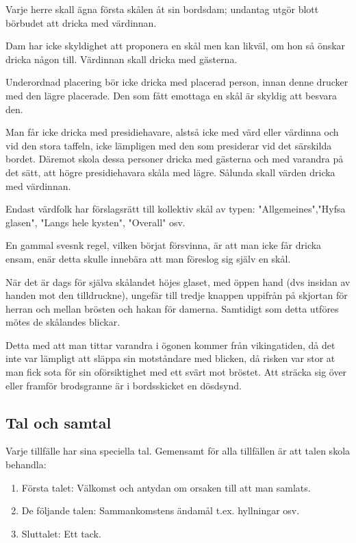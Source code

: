 Varje herre skall ägna första skålen åt sin bordsdam; undantag utgör blott börbudet att dricka med värdinnan.

Dam har icke skyldighet att proponera en skål men kan likväl, om hon så önskar dricka någon till. Värdinnan skall dricka med gästerna.

Underordnad placering bör icke dricka med placerad person, innan denne drucker med den lägre placerade. Den som fått emottaga en skål är skyldig att besvara den.

Man får icke dricka med presidiehavare, alstså icke med värd eller värdinna och vid den stora taffeln, icke lämpligen med den som presiderar vid det särskilda bordet. Däremot skola dessa personer dricka med gästerna och med varandra på det sätt, att högre presidiehavara skåla med lägre. Sålunda skall värden dricka med värdinnan.

Endast värdfolk har förslagsrätt till kollektiv skål av typen: "Allgemeines","Hyfsa glasen", "Langs hele kysten", "Overall" osv.

En gammal svesnk regel, vilken börjat försvinna, är att man icke får dricka ensam, enär detta skulle innebära att man föreslog sig själv en skål.

När det är dags för själva skålandet höjes glaset, med öppen hand (dvs insidan av handen mot den tilldruckne), ungefär till tredje knappen uppifrån på skjortan för herran och mellan brösten och hakan för damerna. Samtidigt som detta utföres mötes de skålandes blickar.

Detta med att man tittar varandra i ögonen kommer från vikingatiden, då det inte var lämpligt att släppa sin motståndare med blicken, då risken var stor at man fick sota för sin oförsiktighet med ett svärt mot bröstet. Att sträcka sig över eller framför brodsgranne är i bordsskicket en dösdsynd.

\subsection{\textbf{Tal och samtal}}

Varje tillfälle har sina speciella tal. Gemensamt för alla tillfällen är att talen skola behandla:
\begin{enumerate}
    \item Första talet: Välkomst och antydan om orsaken till att man samlats.
    \item De följande talen: Sammankomstens ändamål t.ex. hyllningar osv.
    \item Sluttalet: Ett tack.
\end{enumerate}


